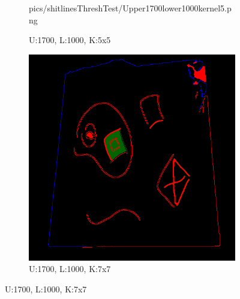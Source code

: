 \documentclass[11pt]{article}
\begin{document}
\begin{figure}[H]
\begin{subfigure}[t]{.25\textwidth}
		{pics/shitlinesThreshTest/Upper1700lower1000kernel5.png}
		\caption{U:1700, L:1000, K:5x5}
	\end{subfigure}
\hfill
	\begin{subfigure}[t]{.25\textwidth}
		\centering
		\includegraphics[scale=0.3]
		{pics/shitlinesThreshTest/Upper1700lower1000kernel7.png}
		\caption{U:1700, L:1000, K:7x7}	
	\end{subfigure}



\end{figure}
\end{document}
